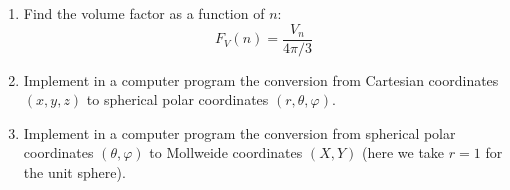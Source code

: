 \documentclass[author-year, prd, amsmath, amssymb, longbibliography, floatfix, reprint, superscriptaddress, a4]{revtex4-1}
\begin{document}
\begin{enumerate}
\item Find the volume factor as a function of \(n\):
$$F_{V}(n) = \frac{V_{n}}{4 \pi / 3}$$

\item Implement in a computer program the conversion from Cartesian coordinates \((x, y, z)\) to spherical polar coordinates \((r, \theta, \varphi)\).

\item Implement in a computer program the conversion from spherical polar coordinates \((\theta, \varphi)\) to Mollweide coordinates \((X, Y)\) (here we take \(r = 1\) for the unit sphere).

\end{enumerate}
\end{document}
